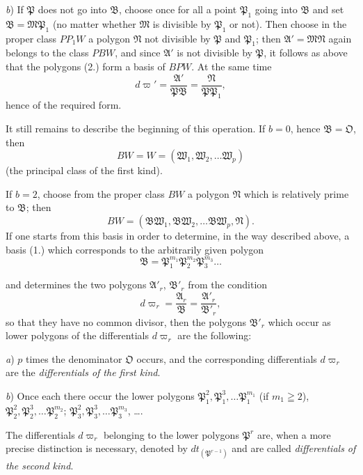\documentclass{article}
\begin{document}
\emph{b}) If $\mathfrak{P}$ does not go into $\mathfrak{B}$, choose once for all a point $\mathfrak{P}_{1}$ going into $\mathfrak{B}$ and set $\mathfrak{B} = \mathfrak{M}\mathfrak{P}_{1}$ (no matter whether $\mathfrak{M}$ is divisible by $\mathfrak{P}_{1}$ or not). Then choose in the proper class $PP_{1}W$ a polygon $\mathfrak{N}$ not divisible by $\mathfrak{P}$ and $\mathfrak{P}_{1}$; then $\mathfrak{A}' = \mathfrak{M}\mathfrak{N}$ again belongs to the class $PBW$, and since $\mathfrak{A}'$ is not divisible by $\mathfrak{P}$, it follows as above that the polygons (2.) form a basis of $BPW$. At the same time
\[ d\varpi' = \frac{\mathfrak{A}'}{\mathfrak{P}\mathfrak{B}} = \frac{\mathfrak{N}}{\mathfrak{P}\mathfrak{P}_{1}}, \]
hence of the required form.

It still remains to describe the beginning of this operation. If $b = 0$, hence $\mathfrak{B} = \mathfrak{O}$, then
\[ BW = W = (\mathfrak{W}_{1}, \mathfrak{W}_{2}, \ldots \mathfrak{W}_{p}) \]
(the principal class of the first kind).

If $b = 2$, choose from the proper class $BW$ a polygon $\mathfrak{N}$ which is relatively prime to $\mathfrak{B}$; then
\[ BW = (\mathfrak{B}\mathfrak{W}_{1}, \mathfrak{B}\mathfrak{W}_{2}, \ldots \mathfrak{B}\mathfrak{W}_{p}, \mathfrak{N}). \]
If one starts from this basis in order to determine, in the way described above, a basis (1.) which corresponds to the arbitrarily given polygon
\[ \mathfrak{B} = \mathfrak{P}_{1}^{m_{1}}\mathfrak{P}_{2}^{m_{2}}\mathfrak{P}_{3}^{m_{3}}\ldots \]

and determines the two polygons $\mathfrak{A}'_{r}$, $\mathfrak{B}'_{r}$ from the condition
\[ d\varpi_{r} = \frac{\mathfrak{A}_{r}}{\mathfrak{B}} = \frac{\mathfrak{A}'_{r}}{\mathfrak{B}'_{r}}, \]
so that they have no common divisor, then the polygons $\mathfrak{B}'_{r}$ which occur as lower polygons of the differentials $d\varpi_{r}$ are the following:

\emph{a}) $p$ times the denominator $\mathfrak{O}$ occurs, and the corresponding differentials $d\varpi_{r}$ are the \emph{differentials of the first kind}.

\emph{b}) Once each there occur the lower polygons $\mathfrak{P}_{1}^{2}, \mathfrak{P}_{1}^{3}, \ldots \mathfrak{P}_{1}^{m_{1}}$ (if $m_{1} \geqq 2$), $\mathfrak{P}_{2}^{2}, \mathfrak{P}_{2}^{3}, \ldots \mathfrak{P}_{2}^{m_{2}}$; $\mathfrak{P}_{3}^{2}, \mathfrak{P}_{3}^{3}, \ldots \mathfrak{P}_{3}^{m_{3}}$, \ldots.

The differentials $d\varpi_{r}$ belonging to the lower polygons $\mathfrak{P}^{r}$ are, when a more precise distinction is necessary, denoted by $dt_{(\mathfrak{P}^{r-1})}$ and are called \emph{differentials of the second kind}.
\end{document}
